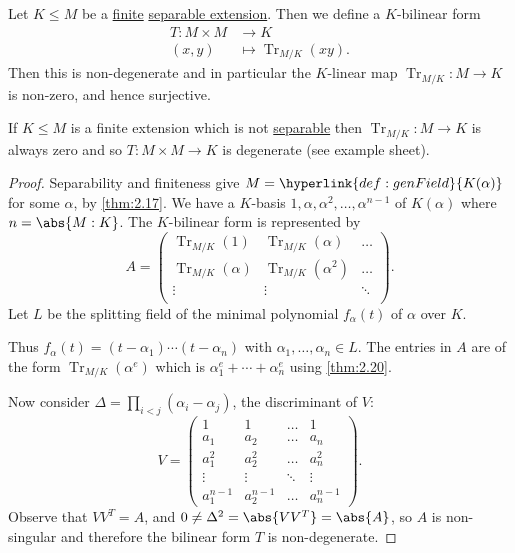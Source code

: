 \documentclass{article}
\DeclareMathOperator{\Tr}{Tr}
\begin{document}

\begin{nthm}\label{thm:2.21}
    Let $K \leq M$ be a \hyperlink{def:degreeOfFieldExt}{finite} \hyperlink{def:separableExt}{separable extension}.
    Then we define a $K$-bilinear form
    \begin{align*}
        T: M \times M &\rightarrow K \\
        (x, y) &\longmapsto \Tr_{M/K} (xy).
    \end{align*}
    Then this is non-degenerate and in particular the $K$-linear map $\Tr_{M/K}:M \to K$ is non-zero, and hence surjective.
\end{nthm}

\begin{remark}
    If $K \leq M$ is a finite extension which is not \hyperlink{def:separableExt}{separable} then $\Tr_{M/K}: M \to K$ is always zero and so $T:M\times M \to K$ is degenerate (see example sheet).
\end{remark}

\begin{proof}
    Separability and finiteness give $M=\hyperlink{def:genField}{K(\alpha)}$ for some $\alpha$, by \cref{thm:2.17}.
    We have a $K$-basis $1, \alpha, \alpha^2, \dotsc, \alpha^{n-1}$ of $K(\alpha)$ where $n = \abs{M:K}$.
    The $K$-bilinear form is represented by
    \begin{equation*}
        A =
        \begin{pmatrix}
            \Tr_{M/K}(1)      & \Tr_{M/K}(\alpha)   & \dots  \\
            \Tr_{M/K}(\alpha) & \Tr_{M/K}(\alpha^2) & \dots  \\
            \vdots            & \vdots              & \ddots \\
        \end{pmatrix}.
    \end{equation*}
    Let $L$ be the splitting field of the minimal polynomial $f_\alpha(t)$ of $\alpha$ over $K$.

    Thus $f_\alpha(t) = (t-\alpha_1) \dotsm (t-\alpha_n)$ with $\alpha_1, \dotsc, \alpha_n \in L$.
    The entries in $A$ are of the form $\Tr_{M/K}(\alpha^e)$ which is $\alpha_1^e + \dotsb + \alpha_n^e$ using \cref{thm:2.20}.

    Now consider $\Delta = \prod_{i < j} (\alpha_i - \alpha_j)$, the discriminant of $V$:
    \begin{equation*}
        V =
        \begin{pmatrix}
            1 & 1 & \dots & 1 \\
            a_1 & a_2 & \dots & a_n \\
            a_1^2 & a_2^2 & \dots & a_n^2 \\
            \vdots & \vdots & \ddots & \vdots \\
            a_1^{n-1} & a_2^{n-1} & \dots & a_n^{n-1}
        \end{pmatrix}.
    \end{equation*}
    Observe that $V V^T = A$, and $0 \neq \Delta^2 = \abs{V V^T} = \abs{A}$, so $A$ is non-singular and therefore the bilinear form $T$ is non-degenerate.
\end{proof}
\end{document}
